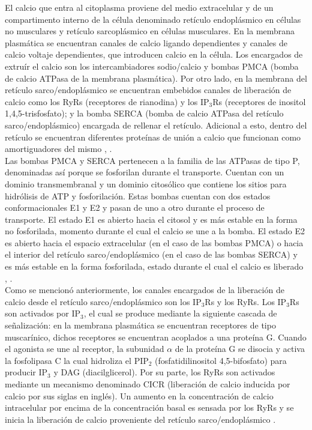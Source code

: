 \documentclass[draft]{article}
\begin{document}
El calcio que entra al citoplasma proviene del medio extracelular y de un compartimento interno de la célula denominado retículo endoplásmico en células no musculares y retículo sarcoplásmico en células musculares. En la membrana plasmática se encuentran canales de calcio ligando dependientes y canales de calcio voltaje dependientes, que introducen calcio en la célula. Los encargados de extruír el calcio son los intercambiadores sodio/calcio y bombas PMCA (bomba de calcio ATPasa de la membrana plasmática). Por otro lado, en la membrana del retículo sarco/endoplásmico se encuentran embebidos canales de liberación de calcio como los RyRs (receptores de rianodina) y los IP$_3$Rs (receptores de inositol 1,4,5-trisfosfato); y la bomba SERCA (bomba de calcio ATPasa del retículo sarco/endoplásmico) encargada de rellenar el retículo. Adicional a esto, dentro del retículo se encuentran diferentes proteínas de unión a calcio que funcionan como amortiguadores del mismo \cite{Guerrero-Hernandez2010}, \cite{Carafoli2003}. \\

Las bombas PMCA y SERCA pertenecen a la familia de las ATPasas de tipo P, denominadas así porque se fosforilan durante el transporte. Cuentan con un dominio transmembranal y un dominio citosólico que contiene los sitios para hidrólisis de ATP y fosforilación. Estas bombas cuentan con dos estados conformacionales E1 y E2 y pasan de uno a otro durante el proceso de transporte. El estado E1 es abierto hacia el citosol y es más estable en la forma no fosforilada, momento durante el cual el calcio se une a la bomba. El estado E2 es abierto  hacia el espacio extracelular (en el caso de las bombas PMCA) o hacia el interior del retículo sarco/endoplásmico (en el caso de las bombas SERCA) y es más estable en la forma fosforilada, estado durante el cual el calcio es liberado \cite{Carafoli2003}, \cite{Perez-Rosas2016}. \\


Como se mencionó anteriormente, los canales encargados de la liberación de calcio desde el retículo sarco/endoplásmico son los IP$_3$Rs y  los RyRs. Los IP$_3$Rs son activados por  IP$_3$, el cual se produce mediante la siguiente cascada de señalización: en la membrana plasmática se encuentran receptores de tipo muscarínico, dichos receptores se encuentran acoplados a una proteína G. Cuando  el agonista se une al receptor, la subunidad $\alpha$ de la proteína G se disocia y activa la fosfolipasa C la cual hidroliza el PIP$_2$ (fosfatidilinositol 4,5-bifosfato) para producir IP$_3$ y DAG (diacilglicerol). Por su parte, los RyRs son activados mediante un mecanismo denominado CICR (liberación de calcio inducida por calcio por sus siglas en inglés). Un aumento en la concentración de calcio intracelular por encima de la concentración basal es sensada por los RyRs y se inicia la liberación de calcio proveniente del retículo sarco/endoplásmico  \cite{Kass1999}. \\
\end{document}
